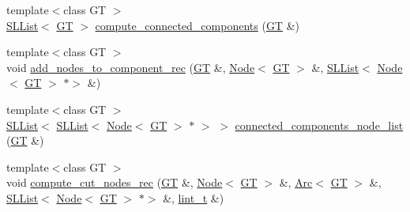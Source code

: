 \begin{DoxyCompactItemize}
\item 
{\footnotesize template$<$class GT $>$ }\\\hyperlink{class_designar_1_1_s_l_list}{S\+L\+List}$<$ \hyperlink{demo-buildgraph_8_c_a3001c40d2c31ca87ed96cd7d1334a55e}{GT} $>$ \hyperlink{namespace_designar_a1f5287eee752172e2db8bd4cd148f93b}{compute\+\_\+connected\+\_\+components} (\hyperlink{demo-buildgraph_8_c_a3001c40d2c31ca87ed96cd7d1334a55e}{GT} \&)
\item 
{\footnotesize template$<$class GT $>$ }\\void \hyperlink{namespace_designar_acdd8c35a3d5633b9b97524010dcee4eb}{add\+\_\+nodes\+\_\+to\+\_\+component\+\_\+rec} (\hyperlink{demo-buildgraph_8_c_a3001c40d2c31ca87ed96cd7d1334a55e}{GT} \&, \hyperlink{namespace_designar_a5af326c65aa2bd26b26c410f2030d09e}{Node}$<$ \hyperlink{demo-buildgraph_8_c_a3001c40d2c31ca87ed96cd7d1334a55e}{GT} $>$ \&, \hyperlink{class_designar_1_1_s_l_list}{S\+L\+List}$<$ \hyperlink{namespace_designar_a5af326c65aa2bd26b26c410f2030d09e}{Node}$<$ \hyperlink{demo-buildgraph_8_c_a3001c40d2c31ca87ed96cd7d1334a55e}{GT} $>$ $\ast$$>$ \&)
\item 
{\footnotesize template$<$class GT $>$ }\\\hyperlink{class_designar_1_1_s_l_list}{S\+L\+List}$<$ \hyperlink{class_designar_1_1_s_l_list}{S\+L\+List}$<$ \hyperlink{namespace_designar_a5af326c65aa2bd26b26c410f2030d09e}{Node}$<$ \hyperlink{demo-buildgraph_8_c_a3001c40d2c31ca87ed96cd7d1334a55e}{GT} $>$ $\ast$ $>$ $>$ \hyperlink{namespace_designar_a8b65b45b1581bbf5b74899490a8b8c61}{connected\+\_\+components\+\_\+node\+\_\+list} (\hyperlink{demo-buildgraph_8_c_a3001c40d2c31ca87ed96cd7d1334a55e}{GT} \&)
\item 
{\footnotesize template$<$class GT $>$ }\\void \hyperlink{namespace_designar_ac547a8b8e0e7a9a8ead8899c02b42128}{compute\+\_\+cut\+\_\+nodes\+\_\+rec} (\hyperlink{demo-buildgraph_8_c_a3001c40d2c31ca87ed96cd7d1334a55e}{GT} \&, \hyperlink{namespace_designar_a5af326c65aa2bd26b26c410f2030d09e}{Node}$<$ \hyperlink{demo-buildgraph_8_c_a3001c40d2c31ca87ed96cd7d1334a55e}{GT} $>$ \&, \hyperlink{namespace_designar_a3f55fb5513d62ff47cbc8f72b8e95d6f}{Arc}$<$ \hyperlink{demo-buildgraph_8_c_a3001c40d2c31ca87ed96cd7d1334a55e}{GT} $>$ \&, \hyperlink{class_designar_1_1_s_l_list}{S\+L\+List}$<$ \hyperlink{namespace_designar_a5af326c65aa2bd26b26c410f2030d09e}{Node}$<$ \hyperlink{demo-buildgraph_8_c_a3001c40d2c31ca87ed96cd7d1334a55e}{GT} $>$ $\ast$$>$ \&, \hyperlink{namespace_designar_a9d113d66a39e82b73727c72cd3a52f73}{lint\+\_\+t} \&)

\end{DoxyCompactItemize}
